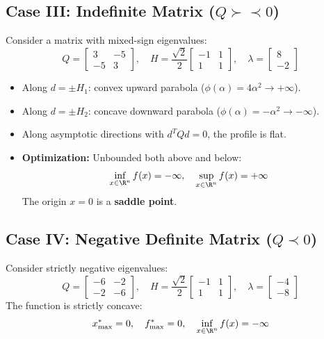 \subsection{Case III: Indefinite Matrix (\texorpdfstring{$Q \succ\prec 0$}{Q ind})}
Consider a matrix with mixed-sign eigenvalues:
\begin{equation}
Q = \begin{bmatrix} 3 & -5 \\ -5 & 3 \end{bmatrix}, \quad H = \frac{\sqrt{2}}{2} \begin{bmatrix} -1 & 1 \\ 1 & 1 \end{bmatrix}, \quad \lambda = \begin{bmatrix} 8 \\ -2 \end{bmatrix}
\end{equation}
\begin{itemize}
    \item Along $d = \pm H_1$: convex upward parabola ($\phi(\alpha) = 4\alpha^2 \to +\infty$).
    \item Along $d = \pm H_2$: concave downward parabola ($\phi(\alpha) = -\alpha^2 \to -\infty$).
    \item Along asymptotic directions with $d^T Q d = 0$, the profile is flat.
    \item \textbf{Optimization:} Unbounded both above and below:
    \begin{equation}
    \inf_{x \in \R^n} f(x) = -\infty, \quad \sup_{x \in \R^n} f(x) = +\infty
    \end{equation}
    The origin $x = 0$ is a \textbf{saddle point}.
\end{itemize}

\subsection{Case IV: Negative Definite Matrix (\texorpdfstring{$Q \prec 0$}{Q < 0})}
Consider strictly negative eigenvalues:
\begin{equation}
Q = \begin{bmatrix} -6 & -2 \\ -2 & -6 \end{bmatrix}, \quad H = \frac{\sqrt{2}}{2} \begin{bmatrix} -1 & 1 \\ 1 & 1 \end{bmatrix}, \quad \lambda = \begin{bmatrix} -4 \\ -8 \end{bmatrix}
\end{equation}
The function is strictly concave:
\begin{equation}
x^*_{\max} = 0, \quad f^*_{\max} = 0, \quad \inf_{x \in \R^n} f(x) = -\infty
\end{equation}


